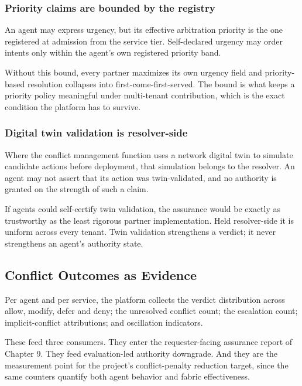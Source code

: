 \hypertarget{priority-claims-are-bounded-by-the-registry}{%
\subsubsection{Priority claims are bounded by the registry}\label{priority-claims-are-bounded-by-the-registry}}

An agent may express urgency, but its effective arbitration priority is
the one registered at admission from the service tier. Self-declared
urgency may order intents only within the agent's own registered
priority band.

Without this bound, every partner maximizes its own urgency field and
priority-based resolution collapses into first-come-first-served. The
bound is what keeps a priority policy meaningful under multi-tenant
contribution, which is the exact condition the platform has to survive.

\hypertarget{digital-twin-validation-is-resolver-side}{%
\subsubsection{Digital twin validation is resolver-side}\label{digital-twin-validation-is-resolver-side}}

Where the conflict management function uses a network digital twin to
simulate candidate actions before deployment, that simulation belongs to
the resolver. An agent may not assert that its action was
twin-validated, and no authority is granted on the strength of such a
claim.

If agents could self-certify twin validation, the assurance would be
exactly as trustworthy as the least rigorous partner implementation.
Held resolver-side it is uniform across every tenant. Twin validation
strengthens a verdict; it never strengthens an agent's authority state.

\hypertarget{conflict-outcomes-as-evidence}{%
\subsection{Conflict Outcomes as Evidence}\label{conflict-outcomes-as-evidence}}

Per agent and per service, the platform collects the verdict
distribution across allow, modify, defer and deny; the unresolved
conflict count; the escalation count; implicit-conflict attributions;
and oscillation indicators.

These feed three consumers. They enter the requester-facing assurance
report of Chapter 9. They feed evaluation-led authority downgrade. And
they are the measurement point for the project's conflict-penalty
reduction target, since the same counters quantify both agent behavior
and fabric effectiveness.

